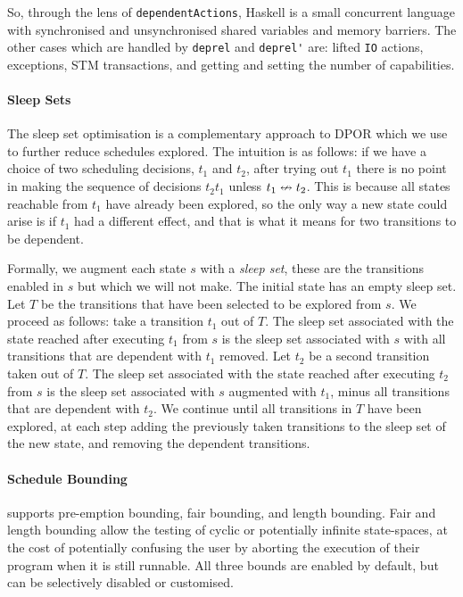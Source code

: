 So, through the lens of \verb|dependentActions|, Haskell is a small
concurrent language with synchronised and unsynchronised shared
variables and memory barriers.  The other cases which are handled by
\verb|deprel| and \verb|deprel'| are: lifted \verb|IO| actions,
exceptions, STM transactions, and getting and setting the number of
capabilities.

\paragraph{Sleep Sets}
The sleep set optimisation is a complementary approach to
DPOR\cite{flanagan2005,godefroid1996} which we use to further reduce
schedules explored.  The intuition is as follows: if we have a choice
of two scheduling decisions, $t_{1}$ and $t_{2}$, after trying out
$t_{1}$ there is no point in making the sequence of decisions
$t_{2}t_{1}$ unless $t_{1} \nleftrightarrow t_{2}$.  This is because all
states reachable from $t_{1}$ have already been explored, so the only
way a new state could arise is if $t_{1}$ had a different effect, and
that is what it means for two transitions to be dependent.

Formally, we augment each state $s$ with a \emph{sleep set}, these are
the transitions enabled in $s$ but which we will not make.  The
initial state has an empty sleep set.  Let $T$ be the transitions that
have been selected to be explored from $s$.  We proceed as follows:
take a transition $t_{1}$ out of $T$.  The sleep set associated with
the state reached after executing $t_{1}$ from $s$ is the sleep set
associated with $s$ with all transitions that are dependent with
$t_{1}$ removed.  Let $t_{2}$ be a second transition taken out of $T$.
The sleep set associated with the state reached after executing
$t_{2}$ from $s$ is the sleep set associated with $s$ augmented with
$t_{1}$, minus all transitions that are dependent with $t_{2}$.  We
continue until all transitions in $T$ have been explored, at each step
adding the previously taken transitions to the sleep set of the new
state, and removing the dependent transitions.

\paragraph{Schedule Bounding}
\dejafu{} supports pre-emption bounding\cite{musuvathi2007}, fair
bounding\cite{musuvathi2008}, and length bounding.  Fair and length
bounding allow the testing of cyclic or potentially infinite
state-spaces, at the cost of potentially confusing the user by
aborting the execution of their program when it is still runnable.
All three bounds are enabled by default, but can be selectively
disabled or customised.

